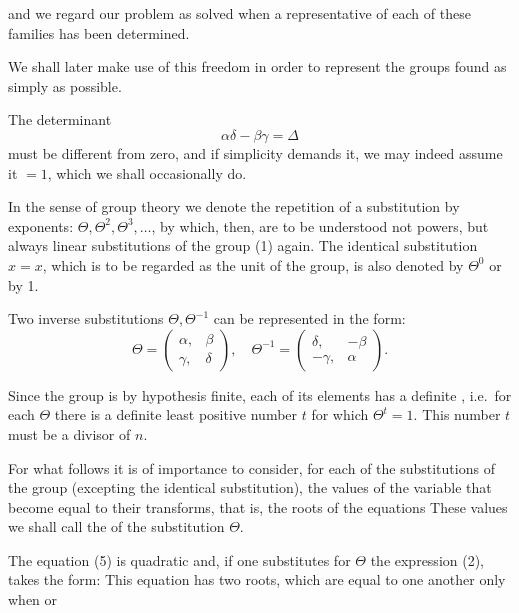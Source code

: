 and we regard our problem as solved when a representative of each
of these families has been determined.

We shall later make use of this freedom in order to represent
the groups found as simply as possible.

The determinant
\[
\alpha\delta - \beta\gamma = \Delta
\]
must be different from zero, and if simplicity demands it,
we may indeed assume it $= 1$, which we shall occasionally
do.

In the sense of group theory we denote the repetition
of a substitution by exponents: $\Theta, \Theta^2, \Theta^3, \ldots$,
by which, then, are to be understood not powers, but always
linear substitutions of the group (1) again. The identical
substitution $x = x$, which is to be regarded as the unit of the
group, is also denoted by $\Theta^0$ or by 1.

Two inverse substitutions $\Theta, \Theta^{-1}$ can be represented
in the form:
\[
\Theta = \begin{pmatrix} \alpha, & \beta \\ \gamma, & \delta \end{pmatrix}, \quad
\Theta^{-1} = \begin{pmatrix} \delta, & -\beta \\ -\gamma, & \alpha \end{pmatrix}.
\]

Since the group is by hypothesis finite, each of its
elements has a definite , i.e.\ for each $\Theta$ there
is a definite least positive number $t$ for which $\Theta^t = 1$.
This number $t$ must be a divisor of $n$.

For what follows it is of importance to consider, for each
of the substitutions of the group (excepting the identical
substitution), the values of the variable that become equal to
their transforms, that is, the roots of the equations
These values we shall call the  of the substitution $\Theta$.

The equation (5) is quadratic and, if one substitutes for
$\Theta$ the expression (2), takes the form:
This equation has two roots, which are equal to one another
only when
or
